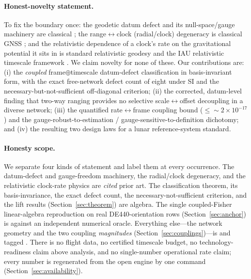 \paragraph{Honest-novelty statement.}
To fix the boundary once: the geodetic datum defect and its null-space/gauge machinery are
classical \citep{baarda1973,teunissen2000}; the range$\leftrightarrow$clock (radial/clock)
degeneracy is classical GNSS \citep{sturza1988,brown1992,parkinson1988}; and the
relativistic dependence of a clock's rate on the gravitational potential it sits in is
standard relativistic geodesy and the IAU relativistic timescale framework
\citep{soffel2003iau,mueller2018clocks}. We claim novelty for none of these. Our
contributions are: (i) the \emph{coupled} frame$\oplus$timescale datum-defect
classification in basis-invariant form, with the exact free-network defect count of eight
under SI and the necessary-but-not-sufficient off-diagonal criterion; (ii) the corrected,
datum-level finding that two-way ranging provides no selective scale$\leftrightarrow$offset
decoupling in a diverse network; (iii) the quantified rate$\leftrightarrow$frame coupling
bound ($\leq\!\sim\!2\times10^{-17}$) and the gauge-robust-to-estimation /
gauge-sensitive-to-definition dichotomy; and (iv) the resulting two design laws for a
lunar reference-system standard.

\paragraph{Honesty scope.}
We separate four kinds of statement and label them at every occurrence. The datum-defect
and gauge-freedom machinery, the radial/clock degeneracy, and the relativistic clock-rate
physics are \emph{cited} prior art. The classification theorem, its basis-invariance, the
exact defect count, the necessary-not-sufficient criterion, and the lift results
(Section~\ref{sec:theorem}) are \Proven{} algebra. The single coupled-Fisher
linear-algebra reproduction on real DE440-orientation rows (Section~\ref{sec:anchor}) is
\Validated{} against an independent numerical oracle. Everything else---the network
geometry and the two coupling \emph{magnitudes} (Section~\ref{sec:couplings})---is
\Modelled{} and tagged \modtag{}. There is no flight data, no certified timescale budget,
no technology-readiness claim above analysis, and no single-number operational rate claim;
every number is regenerated from the open engine by one command
(Section~\ref{sec:availability}).
